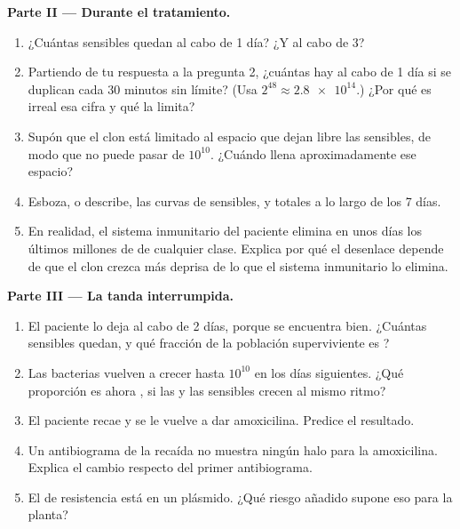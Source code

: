 \begin{problem}
\medskip
\noindent\textbf{Parte II --- Durante el tratamiento.}
\begin{enumerate}[resume]
  \item ¿Cuántas  sensibles quedan al cabo de 1 día? ¿Y al cabo
        de 3?
  \item Partiendo de tu respuesta a la pregunta 2, ¿cuántas 
         hay al cabo de 1 día si se duplican cada 30 minutos
        sin límite? (Usa $2^{48} \approx \num{2.8e14}$.) ¿Por qué es
        irreal esa cifra y qué la limita?
  \item Supón que el clon  está limitado al espacio que dejan
        libre las  sensibles, de modo que no puede pasar de
        $10^{10}$. ¿Cuándo llena aproximadamente ese espacio?
  \item Esboza, o describe, las curvas de  sensibles,
         y totales a lo largo de los 7 días.
  \item En realidad, el sistema inmunitario del paciente elimina en
        unos días los últimos millones de  de cualquier clase.
        Explica por qué el desenlace depende de que el clon 
        crezca más deprisa de lo que el sistema inmunitario lo elimina.
\end{enumerate}

\medskip
\noindent\textbf{Parte III --- La tanda interrumpida.}
\begin{enumerate}[resume]
  \item El paciente lo deja al cabo de 2 días, porque se encuentra
        bien. ¿Cuántas  sensibles quedan, y qué fracción de la
        población superviviente es ?
  \item Las bacterias vuelven a crecer hasta $10^{10}$ en los días
        siguientes. ¿Qué proporción es ahora , si las 
         y las sensibles crecen al mismo ritmo?
  \item El paciente recae y se le vuelve a dar amoxicilina. Predice el
        resultado.
  \item Un antibiograma de la recaída no muestra ningún halo para la
        amoxicilina. Explica el cambio respecto del primer
        antibiograma.
  \item El  de resistencia está en un plásmido. ¿Qué riesgo añadido
        supone eso para la planta?
\end{enumerate}


\end{problem}
